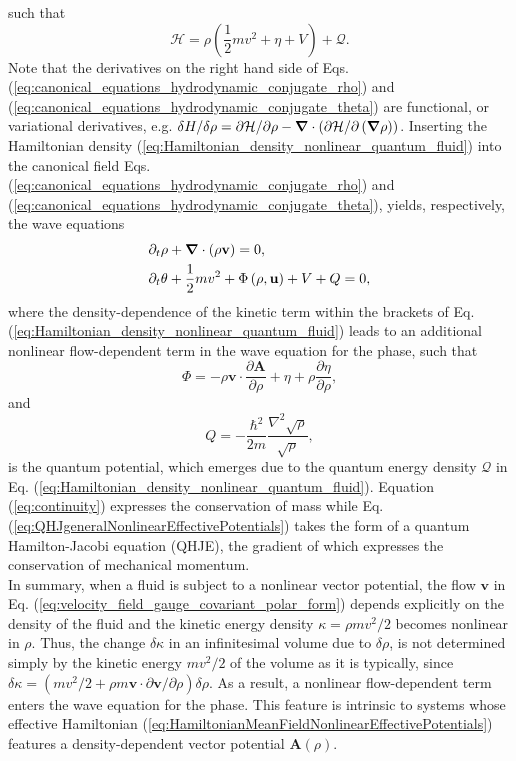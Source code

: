 \documentclass[twocolumn, nofootinbib, nobibnotes, amsmath,amssymb,aps, pra, floatfix]{revtex4-1}
\renewcommand{\v}[1]{\ensuremath{\mathbf{#1}}} %
\newcommand{\gv}[1]{\ensuremath{\mbox{\boldmath$ #1 $}}} %
\newcommand{\pd}[2]{\frac{\partial #1}{\partial #2}} %
\newcommand{\grad}[1]{\gv{\nabla} #1} %
\renewcommand{\div}[1]{\gv{\nabla} \cdot #1} %
\begin{document}
such that
\begin{equation}
  \mathcal{H}=\rho\left(\frac{1}{2}mv^2+\eta+ V\right) +\mathcal{Q}.
  \label{eq:Hamiltonian_density_nonlinear_quantum_fluid}
\end{equation}
Note that the derivatives on the right hand side of Eqs. (\ref{eq:canonical_equations_hydrodynamic_conjugate_rho}) and (\ref{eq:canonical_equations_hydrodynamic_conjugate_theta}) are functional, or variational derivatives, e.g. $\delta H/\delta\rho=\partial\mathcal{H}/\partial\rho-\grad{}\cdot\left( \partial\mathcal{H}/\partial\left( \grad{\rho} \right) \right)$.
Inserting the Hamiltonian density (\ref{eq:Hamiltonian_density_nonlinear_quantum_fluid}) into the canonical field Eqs. (\ref{eq:canonical_equations_hydrodynamic_conjugate_rho}) and (\ref{eq:canonical_equations_hydrodynamic_conjugate_theta}), yields, respectively, the wave equations
\begin{align}
  \partial_t&\rho+\div{\left( \rho\v{v} \right)}=0, \label{eq:continuity} \\
  \partial_t&\theta+\frac{1}{2}mv^2+\Phi\left( \rho,\v{u} \right)+V+Q=0, \label{eq:QHJgeneralNonlinearEffectivePotentials}
\end{align}
where the density-dependence of the kinetic term within the brackets of Eq. (\ref{eq:Hamiltonian_density_nonlinear_quantum_fluid}) leads to an additional nonlinear flow-dependent term in the wave equation for the phase, such that 
\begin{equation}
  \Phi=-\rho\v{v}\cdot\pd{\v{A}}{\rho}+\eta+\rho\pd{\eta}{\rho},
  \label{eq:nonlinearPotentialQHJE}
\end{equation}
and
\begin{equation}
  Q=-\frac{\hbar^2}{2m}\frac{\nabla^2\sqrt{\rho}}{\sqrt{\rho}},
  \label{eq:quantum_potential}
\end{equation}
is the quantum potential, which emerges due to the quantum energy density $\mathcal{Q}$ in Eq. (\ref{eq:Hamiltonian_density_nonlinear_quantum_fluid}).
Equation (\ref{eq:continuity}) expresses the conservation of mass while Eq. (\ref{eq:QHJgeneralNonlinearEffectivePotentials}) takes the form of a quantum Hamilton-Jacobi equation (QHJE), the gradient of which expresses the conservation of mechanical momentum.\\
In summary, when a fluid is subject to a nonlinear vector potential, the flow $\v{v}$ in Eq. (\ref{eq:velocity_field_gauge_covariant_polar_form}) depends explicitly on the density of the fluid and the kinetic energy density $\kappa=\rho mv^2/2$ becomes nonlinear in $\rho$. 
Thus, the change $\delta\kappa$ in an infinitesimal volume due to $\delta\rho$, is not determined simply by the kinetic energy $mv^2/2$ of the volume as it is typically, since $\delta\kappa=\left(mv^2/2+\rho m\v{v}\cdot\partial\v{v}/\partial\rho\right)\delta\rho$.
As a result, a nonlinear flow-dependent term enters the wave equation for the phase.
This feature is intrinsic to systems whose effective Hamiltonian (\ref{eq:HamiltonianMeanFieldNonlinearEffectivePotentials}) features a density-dependent vector potential $\v{A}\left( \rho \right)$.
\end{document}
